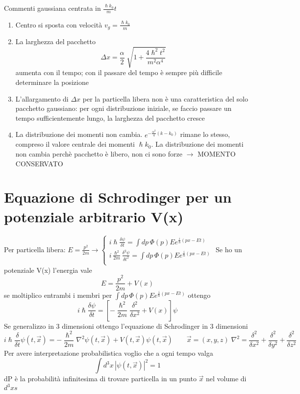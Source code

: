 \documentclass[a4paper,11pt]{report}
\theoremstyle{remark}
\theoremstyle{definition}
\begin{document}
Commenti gaussiana centrata in $\frac{\hslash k_0}{m}t$
\begin{enumerate}
    \item Centro si sposta con velocità $v_g = \frac{\hslash k_0}{m}$
    \item La larghezza del pacchetto 
    \begin{equation*}
        \Delta x = \frac{\alpha}{2}\sqrt[]{1 + \frac{4\hslash^2 t^2}{m^2\alpha^4}}
    \end{equation*}
    aumenta con il tempo; con il passare del tempo è sempre più difficile determinare la posizione 
    \item L'allargamento  di $\Delta x$ per la particella libera non è una caratteristica del solo pacchetto gaussiano: per ogni distribuzione iniziale, se faccio passare un tempo sufficientemente lungo, la larghezza del pacchetto cresce
    \item La distribuzione dei momenti non cambia. $e^{-\frac{\alpha^2}{4}(k-k_0)}$ rimane lo stesso, compreso il valore centrale dei momenti $\hslash k_0$. La distribuzione dei momenti non cambia perchè pacchetto è libero, non ci sono forze $\rightarrow$ MOMENTO CONSERVATO 
\end{enumerate}

\section{Equazione di Schrodinger per un potenziale arbitrario V(x)}

Per particella libera: $E = \frac{p^2}{2m} \rightarrow
\begin{cases}
    i\hslash \frac{\delta \psi}{\delta t} = \int dp \, \varPhi(p)E e^{\frac{i}{\hslash}(px-Et)} \\
    i\frac{\hslash^2}{2m} \frac{\delta^2 \psi}{\delta t^2} = \int dp \, \varPhi(p)E e^{\frac{i}{\hslash}(px-Et)} \\
\end{cases}$
Se ho un potenziale V(x) l'energia vale
\begin{equation*}
    E = \frac{p^2}{2m} + V(x)
\end{equation*}
se moltiplico entrambi i membri per $\int dp \, \varPhi(p)E e^{\frac{i}{\hslash}(px-Et)}$ ottengo
\begin{equation*}
    i\hslash \frac{\delta \psi}{\delta t} = \left[-\frac{\hslash^2}{2m}\frac{\delta^2}{\delta x^2} + V(x)\right]\psi
\end{equation*}
Se generalizzo in 3 dimensioni ottengo l'equazione di Schrodinger in 3 dimensioni
\begin{equation*}
    i\hslash \frac{\delta}{\delta t} \psi(t,\vec{x}) = -\frac{\hslash^2}{2m}\nabla^2 \psi(t,\vec{x}) + V(t,\vec{x})\psi(t,\vec{x}) \qquad \vec{x} = (x,y,z) \; \nabla^2 = \frac{\delta^2}{\delta x^2} + \frac{\delta^2}{\delta y^2} + \frac{\delta^2}{\delta z^2}
\end{equation*}
Per avere interpretazione probabilistica voglio che a ogni tempo valga 
\begin{equation*}
    \int d^3x \, {|\psi(t,\vec{x})|}^2 = 1
\end{equation*}
dP è la probabilità infinitesima di trovare particella in un punto $\vec{x}$ nel volume di $d^3 xs$
\end{document}
